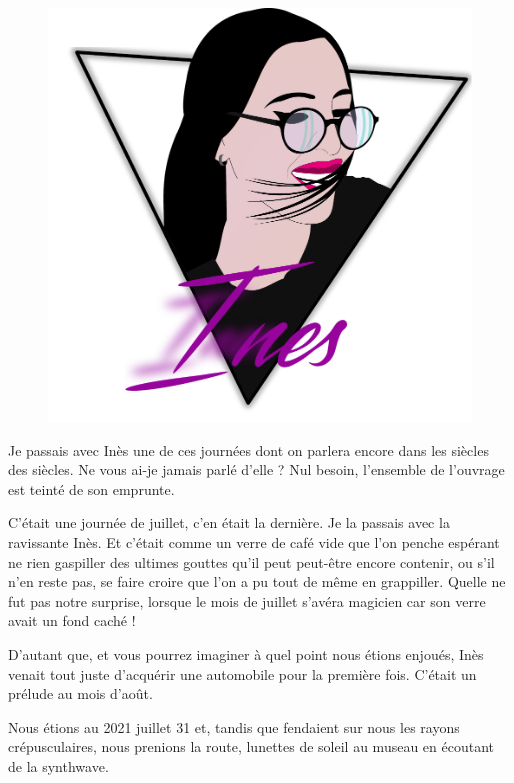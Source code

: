 \begin{figure}[h]
  \centering
  \includegraphics[width=\textwidth]{img/ines-syntwave.pdf}
  \captionsetup{labelformat=empty}
  \caption[Portrait synthwave d’Inès]{}
\end{figure}

\begin{prose}
  Je passais avec Inès une de ces journées dont on parlera encore dans les siècles des siècles. Ne vous ai-je jamais parlé d’elle ? Nul besoin, l’ensemble de l’ouvrage est teinté de son emprunte.

  C’était une journée de juillet, c’en était la dernière. Je la passais avec la ravissante Inès. Et c’était comme un verre de café vide que l’on penche espérant ne rien gaspiller des ultimes gouttes qu’il peut peut-être encore contenir, ou s’il n’en reste pas, se faire croire que l’on a pu tout de même en grappiller.
  Quelle ne fut pas notre surprise, lorsque le mois de juillet s’avéra magicien car son verre avait un fond caché !

  D’autant que, et vous pourrez imaginer à quel point nous étions enjoués, Inès venait tout juste d’acquérir une automobile pour la première fois. C’était un prélude au mois d’août.

  Nous étions au 2021 juillet 31 et, tandis que fendaient sur nous les rayons crépusculaires, nous prenions la route, lunettes de soleil au museau en écoutant de la synthwave.
\end{prose}

